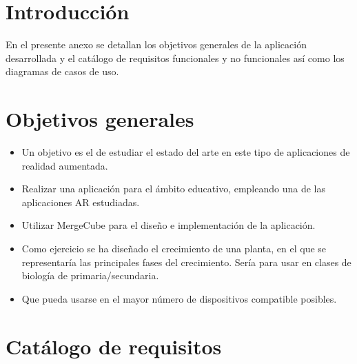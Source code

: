 
\section{Introducción}
En el presente anexo se detallan los objetivos generales de la aplicación desarrollada y el catálogo de requisitos funcionales y no funcionales así como los diagramas de casos de uso.
\section{Objetivos generales}
\begin{itemize}
	\item Un objetivo es el de estudiar el estado del arte en este tipo de aplicaciones de realidad aumentada. 
	\item Realizar una aplicación para el ámbito educativo, empleando una de las aplicaciones AR estudiadas.
	\item Utilizar MergeCube para el diseño e implementación de la aplicación.
	\item Como ejercicio se ha diseñado el crecimiento de una planta, en el que se representaría las principales fases del crecimiento. Sería para usar en clases de biología de primaria/secundaria.
	\item Que pueda usarse en el mayor número de dispositivos compatible posibles.
\end{itemize}
\section{Catálogo de requisitos}
